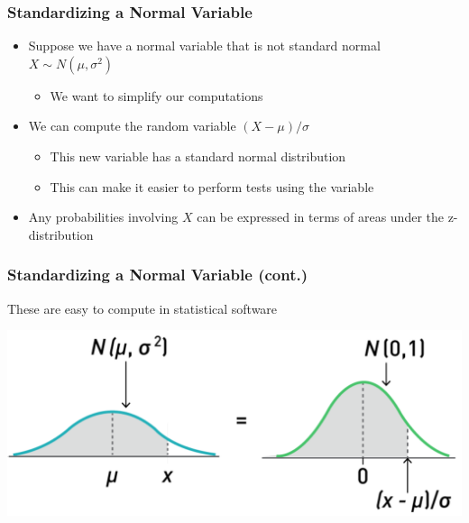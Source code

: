 \documentclass[12pt, block=fill]{beamer}
\begin{document}
\begin{frame}
  \frametitle{Standardizing a Normal Variable}
  \begin{itemize}
      \item Suppose we have a normal variable that is not standard normal $X \sim N(\mu, \sigma^{2})$
      \begin{itemize}
          \item We want to simplify our computations
      \end{itemize}
      \item We can compute the random variable $(X-\mu) / \sigma$
      \begin{itemize}
          \item This new variable has a standard normal distribution
          \item This can make it easier to perform tests using the variable
      \end{itemize}
      \item Any probabilities involving $X$ can be expressed in terms of areas under the z-distribution
  \end{itemize}
\end{frame}

\begin{frame}
  \frametitle{Standardizing a Normal Variable (cont.)}
  These are easy to compute in statistical software
  \begin{center}
    \includegraphics[width=0.9\linewidth]{figures/standardizing_normal_variable.png}
  \end{center}
\end{frame}
\end{document}
